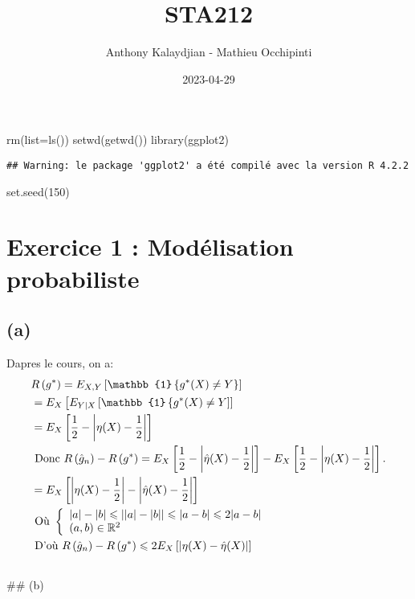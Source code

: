 \documentclass[
]{article}
\title{STA212}
\author{Anthony Kalaydjian - Mathieu Occhipinti}
\date{2023-04-29}
\newenvironment{Shaded}{\begin{snugshade}}{\end{snugshade}}
\newcommand{\AttributeTok}[1]{\textcolor[rgb]{0.77,0.63,0.00}{#1}}
\newcommand{\DecValTok}[1]{\textcolor[rgb]{0.00,0.00,0.81}{#1}}
\newcommand{\FunctionTok}[1]{\textcolor[rgb]{0.00,0.00,0.00}{#1}}
\newcommand{\NormalTok}[1]{#1}
\begin{document}
\maketitle

\begin{Shaded}
\begin{Highlighting}[]
\FunctionTok{rm}\NormalTok{(}\AttributeTok{list=}\FunctionTok{ls}\NormalTok{())}
\FunctionTok{setwd}\NormalTok{(}\FunctionTok{getwd}\NormalTok{())}
\FunctionTok{library}\NormalTok{(ggplot2)}
\end{Highlighting}
\end{Shaded}

\begin{verbatim}
## Warning: le package 'ggplot2' a été compilé avec la version R 4.2.2
\end{verbatim}

\begin{Shaded}
\begin{Highlighting}[]
\FunctionTok{set.seed}\NormalTok{(}\DecValTok{150}\NormalTok{)}
\end{Highlighting}
\end{Shaded}

\hypertarget{exercice-1-moduxe9lisation-probabiliste}{%
\section{Exercice 1 : Modélisation
probabiliste}\label{exercice-1-moduxe9lisation-probabiliste}}

\hypertarget{a}{%
\subsection{(a)}\label{a}}

Dapres le cours, on a: \[
\begin{aligned}
& R\left(g^*\right)=E_{X, Y}\left[\mathbb{1}\left\{g^*(X) \neq Y\right\}\right] \\
& =E_X\left[E_{Y \mid X}\left[\mathbb{1}\left\{g^*(X)\neq Y\right]\right]\right. \\
& =E_X\left[\frac{1}{2}-\left| \eta (X)-\frac{1}{2} \right|\right] \\
& \text { Donc } R\left(\hat{g}_n\right)-R\left(g^*\right)=E_X\left[\frac{1}{2}-\left|\hat{\eta}(X)-\frac{1}{2}\right|\right]-E_X\left[\frac{1}{2}-\left|\eta(X)-\frac{1}{2}\right|\right]. \\
& =E_X\left[\left|\eta(X)-\frac{1}{2}\right|-\left|\hat{\eta}(X)-\frac{1}{2}\right|\right] \\
& \text { Où } \left\{ \begin{array}{l}
|a|-|b|\leqslant||a|-|b||\leqslant| a-b|\leqslant 2| a-b| \\
(a, b) \in \mathbb{R}^2
\end{array}
\right.   \\
\newline 
& \text { D'où } R\left(\hat{g}_n\right)-R\left(g^*\right) \leqslant 2 E_X\left[\left| \eta(X)-\hat{\eta}(X)\right| \right] \\
&
\end{aligned}
\] \#\# (b)
\end{document}
